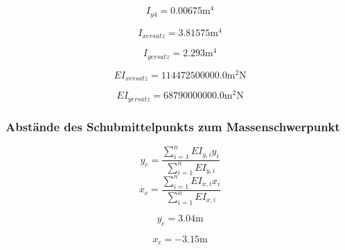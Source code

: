 \documentclass[
  letterpaper,
  DIV=11]{scrreprt}
\begin{document}
\begin{equation*}I_{y4} = 0.00675 \text{m}^{4}\end{equation*}

\begin{equation*}I_{x ersatz} = 3.81575 \text{m}^{4}\end{equation*}

\begin{equation*}I_{y ersatz} = 2.293 \text{m}^{4}\end{equation*}

\begin{equation*}EI_{x ersatz} = 114472500000.0 \text{m}^{2} \text{N}\end{equation*}

\begin{equation*}EI_{y ersatz} = 68790000000.0 \text{m}^{2} \text{N}\end{equation*}

\hypertarget{abstuxe4nde-des-schubmittelpunkts-zum-massenschwerpunkt}{%
\subsubsection{Abstände des Schubmittelpunkts zum
Massenschwerpunkt}\label{abstuxe4nde-des-schubmittelpunkts-zum-massenschwerpunkt}}

\[y_c = \frac{\sum_{i=1}^n EI_{y,i}y_i}{\sum_{i=1}^n EI_{y,i}}\]
\[x_c = \frac{\sum_{i=1}^n EI_{x,i}x_i}{\sum_{i=1}^n EI_{x,i}}\]

\begin{equation*}y_{c} = 3.04 \text{m}\end{equation*}

\begin{equation*}x_{c} = - 3.15 \text{m}\end{equation*}
\end{document}
